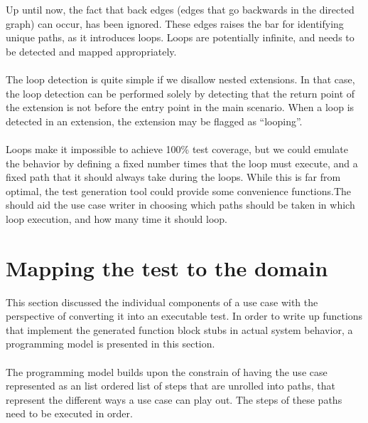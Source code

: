Up until now, the fact that back edges (edges that go backwards in the directed graph) can occur, has been ignored. These edges raises the bar for identifying unique paths, as it introduces loops. Loops are potentially infinite, and needs to be detected and mapped appropriately.\\\\
The loop detection is quite simple if we disallow nested extensions. In that case, the loop detection can be performed solely by detecting that the return point of the extension is not before the entry point in the main scenario. When a loop is detected in an extension, the extension may be flagged as ``looping''.\\\\

\noindent Loops make it impossible to achieve 100\% test coverage, but we could emulate the behavior by defining a fixed number times that the loop must execute, and a fixed path that it should always take during the loops. While this is far from optimal, the test generation tool could provide some convenience functions.The should aid the use case writer in choosing which paths should be taken in which loop execution, and how many time it should loop.

\section{Mapping the test to the domain}
This section discussed the individual components of a use case with the perspective of converting it into an executable test. In order to write up functions that implement the generated function block stubs in actual system behavior, a programming model is presented in this section.\\\\
The programming model builds upon the constrain of having the use case represented as an list ordered list of steps that are unrolled into paths, that represent the different ways a use case can play out. The steps of these paths need to be executed in order.
